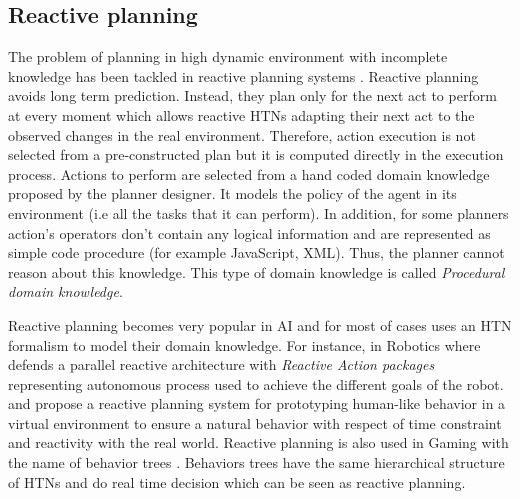 \documentclass[conference]{IEEEtran}
\begin{document}
	\subsection{Reactive planning}
	
	\par The problem of planning in high dynamic environment with incomplete knowledge has been tackled in reactive planning systems \cite{schoppers1987universal}.
	Reactive planning avoids long term prediction. Instead, they plan only for the next act to perform at every moment which allows reactive HTNs adapting their next act to the observed changes in the real environment. Therefore, action execution is not selected from a pre-constructed plan but it is computed directly in the execution process.
	Actions to perform are selected from a hand coded domain knowledge proposed by the planner designer. It models the policy of the agent in its environment (i.e all the tasks that it can perform). In addition, for some planners  \cite{rich2009building} action's operators don't contain any logical information and are represented as simple code procedure (for example JavaScript, XML). Thus, the planner cannot reason about this knowledge. This type of domain knowledge is called \emph{Procedural domain knowledge}.
	\par Reactive planning becomes very popular in AI and for most of cases uses an HTN formalism to model their domain knowledge. For instance, in Robotics where \cite{firby1987investigation} defends a parallel reactive architecture with \emph{Reactive Action packages} representing autonomous process used to achieve the different goals of the robot.  \cite{bryson2001intelligence} and \cite{brom2005hierarchical} propose a reactive planning system for prototyping human-like behavior in a virtual environment to ensure a natural behavior with respect of time constraint and reactivity with the real world. Reactive planning is also used in Gaming with the name of  behavior trees \cite{isla2005handling}. Behaviors trees have the same hierarchical structure of HTNs and do real time decision which can be seen as reactive planning. 
	
\end{document}
